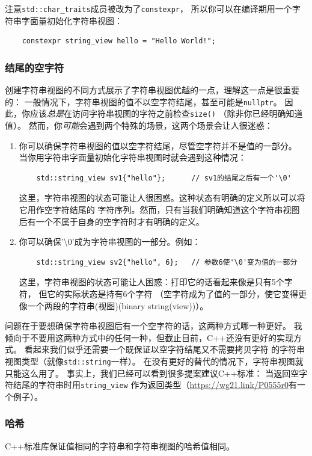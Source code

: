 注意\texttt{std::char\_traits}成员被改为了\texttt{constexpr}，
所以你可以在编译期用一个字符串字面量初始化字符串视图：
\begin{lstlisting}
    constexpr string_view hello = "Hello World!";
\end{lstlisting}

\subsubsection{结尾的空字符}
创建字符串视图的不同方式展示了字符串视图优越的一点，理解这一点是很重要的：
一般情况下，字符串视图的值不以空字符结尾，甚至可能是\texttt{nullptr}。
因此，你应该\emph{总是}在访问字符串视图的字符之前检查\texttt{size()}
（除非你已经明确知道值）。
然而，你\emph{可能}会遇到两个特殊的场景，这两个场景会让人很迷惑：
\begin{enumerate}
    \item 你可以确保字符串视图的值以空字符结尾，尽管空字符并不是值的一部分。
    当你用字符串字面量初始化字符串视图时就会遇到这种情况：
    \begin{lstlisting}
    std::string_view sv1{"hello"};      // sv1的结尾之后有一个'\0'
    \end{lstlisting}
    这里，字符串视图的状态可能让人很困惑。这种状态有明确的定义所以可以将它用作空字符结尾的
    字符序列。然而，只有当我们明确知道这个字符串视图后有一个不属于自身的空字符时才有明确的定义。
    \item 你可以确保'\textbackslash 0'成为字符串视图的一部分。例如：
    \begin{lstlisting}
    std::string_view sv2{"hello", 6};   // 参数6使'\0'变为值的一部分
    \end{lstlisting}
    这里，字符串视图的状态可能让人困惑：打印它的话看起来像是只有5个字符，
    但它的实际状态是持有6个字符
    （空字符成为了值的一部分，使它变得更像一个两段的字符串(视图)(binary string(view))）。
\end{enumerate}
问题在于要想确保字符串视图后有一个空字符的话，这两种方式哪一种更好。
我倾向于不要用这两种方式中的任何一种，但截止目前，C++还没有更好的实现方式。
看起来我们似乎还需要一个既保证以空字符结尾又不需要拷贝字符
的字符串视图类型（就像\texttt{std::string}一样）。
在没有更好的替代的情况下，字符串视图就只能这么用了。
事实上，我们已经可以看到很多提案建议C++标准：
当返回空字符结尾的字符串时用\texttt{string\_view}
作为返回类型（\url{https://wg21.link/P0555r0}有一个例子）。

\subsubsection{哈希}
C++标准库保证值相同的字符串和字符串视图的哈希值相同。

